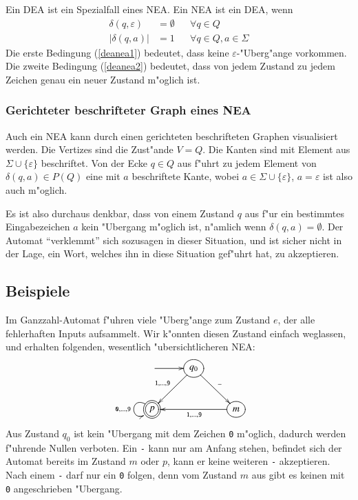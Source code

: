 Ein DEA ist ein Spezialfall eines NEA. Ein NEA ist
ein DEA, wenn
\begin{align}
\delta(q,\varepsilon)&=\emptyset&&\forall q\in Q\label{deanea1}\\
|\delta(q,a)|&=1&&\forall q\in Q, a\in\Sigma\label{deanea2}
\end{align}
Die erste Bedingung (\ref{deanea1}) bedeutet, dass keine
$\varepsilon$-"Uberg"ange vorkommen. Die zweite Bedingung (\ref{deanea2})
bedeutet, dass von jedem Zustand zu jedem Zeichen genau ein
neuer Zustand m"oglich ist.

\subsubsection{Gerichteter beschrifteter Graph eines NEA}
Auch ein NEA kann durch einen gerichteten beschrifteten Graphen
visualisiert werden. Die Vertizes sind die Zust"ande $V=Q$. Die
Kanten sind mit Element aus $\Sigma\cup\{\varepsilon\}$ beschriftet.
Von der Ecke $q\in Q$ aus f"uhrt zu jedem Element von $\delta(q,a)\in P(Q)$
eine mit $a$ beschriftete Kante, wobei $a\in \Sigma\cup\{\varepsilon\}$, $a=\varepsilon$ ist also auch m"oglich.

Es ist also durchaus denkbar, dass von einem Zustand $q$ aus f"ur ein
bestimmtes Eingabezeichen $a$ kein "Ubergang m"oglich ist, n"amlich
wenn $\delta(q,a)=\emptyset$. Der Automat ``verklemmt'' sich sozusagen
in dieser Situation, und ist sicher nicht in der Lage, ein Wort, welches
ihn in diese Situation gef"uhrt hat, zu akzeptieren.


\subsection{Beispiele}
\begin{beispiel}
Im Ganzzahl-Automat f"uhren viele "Uberg"ange zum Zustand $e$, der
alle fehlerhaften Inputs aufsammelt. Wir k"onnten diesen Zustand einfach
weglassen, und erhalten folgenden, wesentlich "ubersichtlicheren NEA:
\[
\entrymodifiers={++[o][F]}
\xymatrix{
*+\txt{}\ar[r]
	&{q_0}  \ar[dl]_{{\tt 1},\dots,{\tt 9}} \ar[dr]^{\tt -}
\\
*++[o][F=]{p}\ar@(ul,dl)_{{\tt 0},\dots,{\tt 9}}
	&*+\txt{}
		&{m} \ar[ll]^{{\tt 1},\dots,{\tt 9}}
}
\]
Aus Zustand $q_0$ ist kein "Ubergang mit dem Zeichen {\tt 0} m"oglich,
dadurch werden f"uhrende Nullen verboten.
Ein {\tt -} kann nur am Anfang
stehen, befindet sich der Automat bereits im Zustand $m$ oder $p$, kann 
er keine weiteren {\tt -} akzeptieren.
Nach einem {\tt -} darf nur ein {\tt 0} folgen, denn vom Zustand $m$
aus gibt es keinen mit {\tt 0} angeschrieben "Ubergang.
\end{beispiel}

